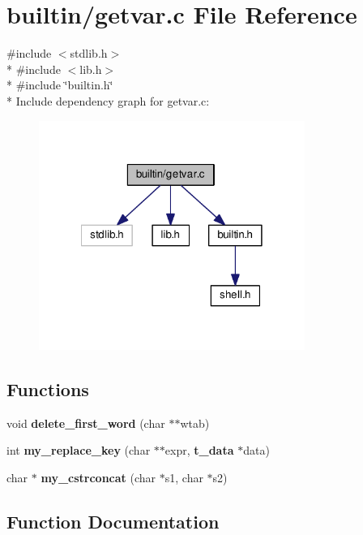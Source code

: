 \section{builtin/getvar.c File Reference}
\label{getvar_8c}
{\ttfamily \#include $<$stdlib.\-h$>$}\\*
{\ttfamily \#include $<$lib.\-h$>$}\\*
{\ttfamily \#include \char`\"{}builtin.\-h\char`\"{}}\\*
Include dependency graph for getvar.\-c\-:\nopagebreak
\begin{figure}[H]
\begin{center}
\leavevmode
\includegraphics[width=246pt]{getvar_8c__incl}
\end{center}
\end{figure}
\subsection*{Functions}
\begin{DoxyCompactItemize}
\item 
void {\bf delete\-\_\-first\-\_\-word} (char $\ast$$\ast$wtab)
\item 
int {\bf my\-\_\-replace\-\_\-key} (char $\ast$$\ast$expr, {\bf t\-\_\-data} $\ast$data)
\item 
char $\ast$ {\bf my\-\_\-cstrconcat} (char $\ast$s1, char $\ast$s2)
\end{DoxyCompactItemize}


\subsection{Function Documentation}
